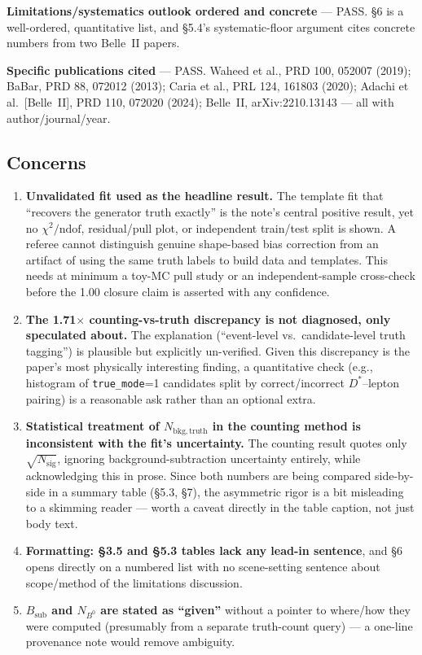 \documentclass[11pt]{article}
\begin{document}
\textbf{Limitations/systematics outlook ordered and concrete} --- PASS.
\S6 is a well-ordered, quantitative list, and \S5.4's systematic-floor
argument cites concrete numbers from two Belle~II papers.

\textbf{Specific publications cited} --- PASS. Waheed et al., PRD 100,
052007 (2019); BaBar, PRD 88, 072012 (2013); Caria et al., PRL 124,
161803 (2020); Adachi et al.\ [Belle~II], PRD 110, 072020 (2024);
Belle~II, arXiv:2210.13143 --- all with author/journal/year.

\subsection*{Concerns}

\begin{enumerate}
\item \textbf{Unvalidated fit used as the headline result.} The template
  fit that ``recovers the generator truth exactly'' is the note's central
  positive result, yet no $\chi^2/\mathrm{ndof}$, residual/pull plot, or
  independent train/test split is shown. A referee cannot distinguish
  genuine shape-based bias correction from an artifact of using the same
  truth labels to build data and templates. This needs at minimum a
  toy-MC pull study or an independent-sample cross-check before the 1.00
  closure claim is asserted with any confidence.
\item \textbf{The 1.71$\times$ counting-vs-truth discrepancy is not
  diagnosed, only speculated about.} The explanation (``event-level vs.\
  candidate-level truth tagging'') is plausible but explicitly
  un-verified. Given this discrepancy is the paper's most physically
  interesting finding, a quantitative check (e.g., histogram of
  \texttt{true\_mode}=1 candidates split by correct/incorrect
  $D^{*}$--lepton pairing) is a reasonable ask rather than an optional
  extra.
\item \textbf{Statistical treatment of $N_{\mathrm{bkg,truth}}$ in the
  counting method is inconsistent with the fit's uncertainty.} The
  counting result quotes only $\sqrt{N_{\mathrm{sig}}}$, ignoring
  background-subtraction uncertainty entirely, while acknowledging this
  in prose. Since both numbers are being compared side-by-side in a
  summary table (\S5.3, \S7), the asymmetric rigor is a bit misleading to
  a skimming reader --- worth a caveat directly in the table caption, not
  just body text.
\item \textbf{Formatting: \S3.5 and \S5.3 tables lack any lead-in
  sentence}, and \S6 opens directly on a numbered list with no
  scene-setting sentence about scope/method of the limitations
  discussion.
\item \textbf{$B_{\mathrm{sub}}$ and $N_{B^0}$ are stated as ``given''}
  without a pointer to where/how they were computed (presumably from a
  separate truth-count query) --- a one-line provenance note would remove
  ambiguity.
\end{enumerate}
\end{document}

